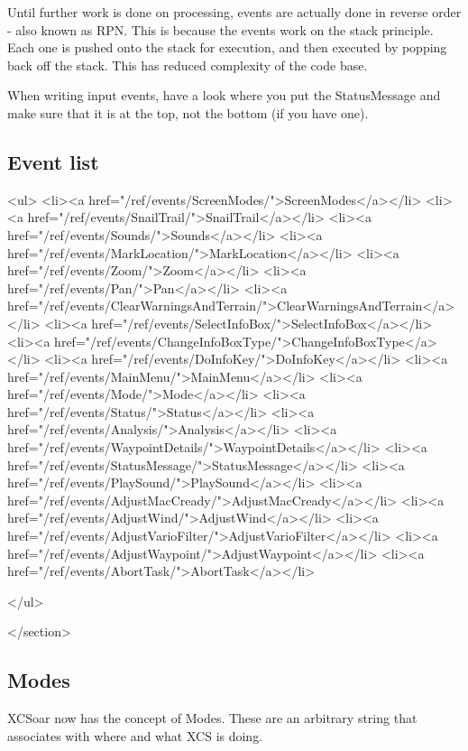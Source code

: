 Until further work is done on processing, events are actually done in
reverse order - also known as RPN. This is because the events work on
the stack principle. Each one is pushed onto the stack for execution,
and then executed by popping back off the stack. This has reduced
complexity of the code base.

When writing input events, have a look where you put the StatusMessage
and make sure that it is at the top, not the bottom (if you have one).

\subsection{Event list}

				<ul>
					<li><a href="/ref/events/ScreenModes/">ScreenModes</a></li>
					<li><a href="/ref/events/SnailTrail/">SnailTrail</a></li>
					<li><a href="/ref/events/Sounds/">Sounds</a></li>
					<li><a href="/ref/events/MarkLocation/">MarkLocation</a></li>
					<li><a href="/ref/events/Zoom/">Zoom</a></li>
					<li><a href="/ref/events/Pan/">Pan</a></li>
					<li><a href="/ref/events/ClearWarningsAndTerrain/">ClearWarningsAndTerrain</a></li>
					<li><a href="/ref/events/SelectInfoBox/">SelectInfoBox</a></li>
					<li><a href="/ref/events/ChangeInfoBoxType/">ChangeInfoBoxType</a></li>
					<li><a href="/ref/events/DoInfoKey/">DoInfoKey</a></li>
					<li><a href="/ref/events/MainMenu/">MainMenu</a></li>
					<li><a href="/ref/events/Mode/">Mode</a></li>
					<li><a href="/ref/events/Status/">Status</a></li>
					<li><a href="/ref/events/Analysis/">Analysis</a></li>
					<li><a href="/ref/events/WaypointDetails/">WaypointDetails</a></li>
					<li><a href="/ref/events/StatusMessage/">StatusMessage</a></li>
					<li><a href="/ref/events/PlaySound/">PlaySound</a></li>
					<li><a href="/ref/events/AdjustMacCready/">AdjustMacCready</a></li>
					<li><a href="/ref/events/AdjustWind/">AdjustWind</a></li>
					<li><a href="/ref/events/AdjustVarioFilter/">AdjustVarioFilter</a></li>
					<li><a href="/ref/events/AdjustWaypoint/">AdjustWaypoint</a></li>
					<li><a href="/ref/events/AbortTask/">AbortTask</a></li>

				</ul>

			</section>

\subsection{Modes}

XCSoar now has the concept of Modes. These are an arbitrary
string that associates with where and what XCS is doing.

